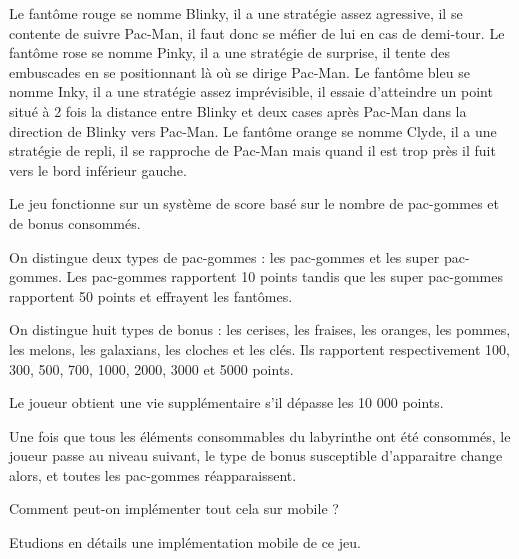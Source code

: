 \documentclass{article}
\begin{document}
Le fantôme rouge se nomme Blinky, il a une stratégie assez agressive, il se contente de suivre Pac-Man, il faut donc se méfier de lui en cas de demi-tour. Le fantôme rose se nomme Pinky, il a une stratégie de surprise, il tente des embuscades en se positionnant là où se dirige Pac-Man. Le fantôme bleu se nomme Inky, il a une stratégie assez imprévisible, il essaie d’atteindre un point situé à 2 fois la distance entre Blinky et deux cases après Pac-Man dans la direction de Blinky vers Pac-Man. Le fantôme orange se nomme Clyde, il a une stratégie de repli, il se rapproche de Pac-Man mais quand il est trop près il fuit vers le bord inférieur gauche.

Le jeu fonctionne sur un système de score basé sur le nombre de pac-gommes et de bonus consommés.

On distingue deux types de pac-gommes : les pac-gommes et les super pac-gommes. Les pac-gommes rapportent 10 points tandis que les super pac-gommes rapportent 50 points et effrayent les fantômes. 

On distingue huit types de bonus : les cerises, les fraises, les oranges, les pommes, les melons, les galaxians, les cloches et les clés. Ils rapportent respectivement 100, 300, 500, 700, 1000, 2000, 3000 et 5000 points.

Le joueur obtient une vie supplémentaire s’il dépasse les 10 000 points.

Une fois que tous les éléments consommables du labyrinthe ont été consommés, le joueur passe au niveau suivant, le type de bonus susceptible d’apparaitre change alors, et toutes les pac-gommes réapparaissent.

Comment peut-on implémenter tout cela sur mobile ?

Etudions en détails une implémentation mobile de ce jeu.
\end{document}
